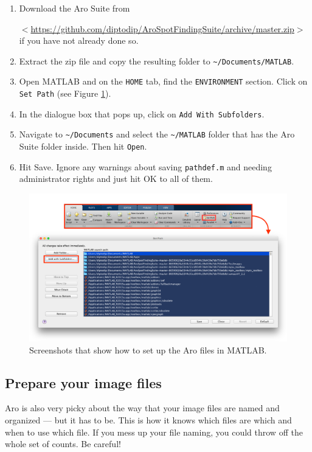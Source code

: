 \documentclass[titlepage,11pt]{article}
\begin{document}
\begin{enumerate}
\item Download the Aro Suite from 

$<$\href{https://github.com/diptodip/AroSpotFindingSuite/archive/master.zip}{https://github.com/diptodip/AroSpotFindingSuite/archive/master.zip}$>$ if you have not already done so.
\item Extract the zip file and copy the resulting folder to \texttt{\~{}/Documents/MATLAB}.
\item Open MATLAB and on the \texttt{HOME} tab, find the \texttt{ENVIRONMENT} section. Click on \texttt{Set Path} (see Figure \ref{fig:aroinstall}).
\item In the dialogue box that pops up, click on \texttt{Add With Subfolders}.
\item Navigate to \texttt{\~{}/Documents} and select the \texttt{\~{}/MATLAB} folder that has the Aro Suite folder inside. Then hit \texttt{Open}.
\item Hit Save. Ignore any warnings about saving \texttt{pathdef.m} and needing administrator rights and just hit OK to all of them.
\end{enumerate}

\begin{figure}
\centering
\includegraphics[scale=1.45]{aroinstall.png}
\caption{Screenshots that show how to set up the Aro files in MATLAB.}
\label{fig:aroinstall}
\end{figure}

\subsection{Prepare your image files} \label{sec:imageprep}

Aro is also very picky about the way that your image files are named and organized --- but it has to be. This is how it knows which files are which and when to use which file. If you mess up your file naming, you could throw off the whole set of counts. Be careful!
\end{document}

